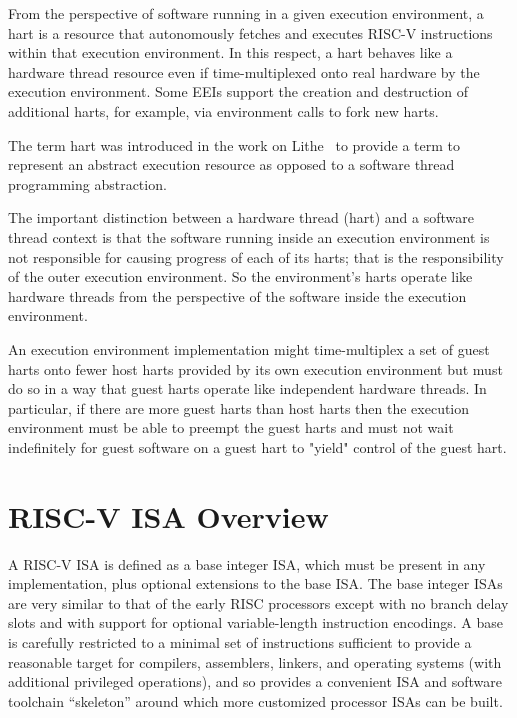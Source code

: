 From the perspective of software running in a given execution
environment, a hart is a resource that autonomously fetches and
executes RISC-V instructions within that execution environment.  In
this respect, a hart behaves like a hardware thread resource even if
time-multiplexed onto real hardware by the execution environment.
Some EEIs support the creation and destruction of additional harts,
for example, via environment calls to fork new harts.

\begin{commentary}
The term hart was introduced in the work on
Lithe~\cite{lithe-pan-hotpar09,lithe-pan-pldi10} to provide a term to
represent an abstract execution resource as opposed to a software
thread programming abstraction.

The important distinction between a hardware thread (hart) and a
software thread context is that the software running inside an
execution environment is not responsible for causing progress of each
of its harts; that is the responsibility of the outer execution
environment.  So the environment's harts operate like hardware threads
from the perspective of the software inside the execution environment.

An execution environment implementation might time-multiplex a set of
guest harts onto fewer host harts provided by its own execution
environment but must do so in a way that guest harts operate like
independent hardware threads.  In particular, if there are more guest
harts than host harts then the execution environment must be able to
preempt the guest harts and must not wait indefinitely for guest
software on a guest hart to "yield" control of the guest hart.
\end{commentary}

\section{RISC-V ISA Overview}

A RISC-V ISA is defined as a base integer ISA, which must be present
in any implementation, plus optional extensions to the base ISA.  The
base integer ISAs are very similar to that of the early RISC processors
except with no branch delay slots and with support for optional
variable-length instruction encodings.  A base is carefully
restricted to a minimal set of instructions sufficient to provide a
reasonable target for compilers, assemblers, linkers, and operating
systems (with additional privileged operations), and so provides
a convenient ISA and software toolchain ``skeleton'' around which more
customized processor ISAs can be built.


